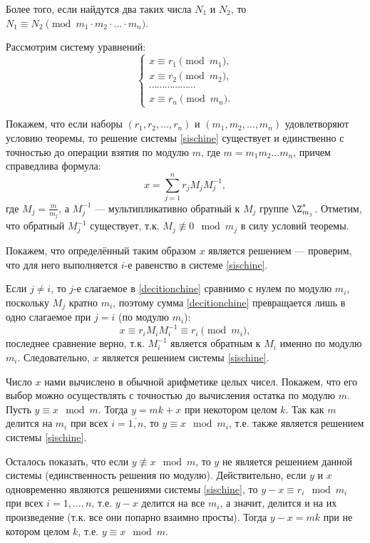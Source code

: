 \begin{enumerate}
\begin{thrm}
Более того, если найдутся два таких числа $N_1$ и $N_2$, то $N_{1}\equiv N_{2}\pmod  {m_{1}\cdot m_{2}\cdot \ldots \cdot m_{n}}$.
\end{thrm}
\pf
Рассмотрим систему уравнений:
\begin{equation}\label{sischine}
\begin{cases}
x\equiv r_{1}{\pmod {m_{1}}},\\
x\equiv r_{2}{\pmod {m_{2}}},\\
\cdots \cdots \cdots \cdots \cdots \cdots \\
x\equiv r_{n}{\pmod {m_{n}}}.
\end{cases}
\end{equation}

Покажем, что если наборы $(r_{1},r_{2},\dots ,r_{n})$ и $(m_{1},m_{2},\dots ,m_{n})$ удовлетворяют условию теоремы, то решение системы \eqref{sischine} существует и единственно с точностью до операции взятия по модулю $m$, где $m=m_1m_2\dots m_n$, причем справедлива формула:
\begin{equation}\label{decitionchine}
x=\sum _{{j=1}}^{n}r_{j}M_{j}M_{j}^{{-1}},
\end{equation}
где $M_{j}=\frac m{m_{j}}$, а $M_{j}^{{-1}}$ --- мультипликативно обратный к $M_{j}$ группе $\Z_{m_j}^*$. Отметим, что обратный $M_j^{-1}$ существует, т.к. $M_j\not\equiv 0\mod m_j$ в силу условий теоремы.

Покажем, что определённый таким образом $x$ является решением --- проверим, что для него выполняется $i$-е равенство в системе \eqref{sischine}.

Если $j\ne i$, то $j$-е слагаемое в \eqref{decitionchine} сравнимо с нулем по модулю $m_i$, поскольку $M_j$ кратно $m_i$, поэтому сумма \eqref{decitionchine} превращается лишь в одно слагаемое при $j=i$ (по модулю $m_i$):
$$
x\equiv r_{i}M_{i}M_{i}^{{-1}}\equiv r_i\pmod m_i,
$$
последнее сравнение верно, т.к. $M_i^{-1}$ является обратным к $M_i$ именно по модулю $m_i$. Следовательно,
$x$ является решением системы \eqref{sischine}.

Число $x$ нами вычислено в обычной арифметике целых чисел. Покажем, что его выбор можно осуществлять с точностью до вычисления остатка по модулю $m$. Пусть $y\equiv x\mod m$. Тогда $y=mk+x$ при некотором целом $k$. Так как $m$ делится на $m_i$ при всех $i=\overline{1,n}$, то $y\equiv x\mod m_i$, т.е. также является решением системы \eqref{sischine}.

Осталось показать, что если $y\not\equiv x\mod m$, то $y$ не является решением данной системы (единственность решения по модулю). Действительно, если $y$ и $x$ одновременно являются решениями системы \eqref{sischine}, то $y-x \equiv r_i\mod m_i$ при всех $i=1,\dots,n$, т.е. $y-x$ делится на все $m_i$, а значит, делится и на их произведение (т.к. все они попарно взаимно просты). Тогда $y-x=mk$ при не котором целом $k$, т.е. $y\equiv x\mod m$.


\end{enumerate}
